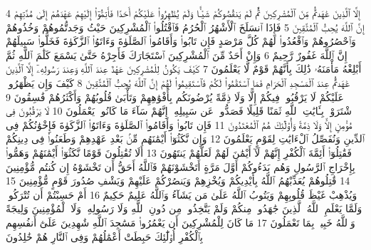 {\tiny\colorbox{cl_aya}{4}} إِلَّا ٱلَّذِينَ عَٰهَدتُّم مِّنَ ٱلْمُشْرِكِينَ ثُمَّ لَمْ يَنقُصُوكُمْ شَيْـًٔا وَلَمْ يُظَٰهِرُوا۟ عَلَيْكُمْ أَحَدًا فَأَتِمُّوٓا۟ إِلَيْهِمْ عَهْدَهُمْ إِلَىٰ مُدَّتِهِمْ إِنَّ ٱللَّهَ يُحِبُّ ٱلْمُتَّقِينَ
{\tiny\colorbox{cl_aya}{5}} فَإِذَا ٱنسَلَخَ ٱلْأَشْهُرُ ٱلْحُرُمُ فَٱقْتُلُوا۟ ٱلْمُشْرِكِينَ حَيْثُ وَجَدتُّمُوهُمْ وَخُذُوهُمْ وَٱحْصُرُوهُمْ وَٱقْعُدُوا۟ لَهُمْ كُلَّ مَرْصَدٍ فَإِن تَابُوا۟ وَأَقَامُوا۟ ٱلصَّلَوٰةَ وَءَاتَوُا۟ ٱلزَّكَوٰةَ فَخَلُّوا۟ سَبِيلَهُمْ إِنَّ ٱللَّهَ غَفُورٌ رَّحِيمٌ
{\tiny\colorbox{cl_aya}{6}} وَإِنْ أَحَدٌ مِّنَ ٱلْمُشْرِكِينَ ٱسْتَجَارَكَ فَأَجِرْهُ حَتَّىٰ يَسْمَعَ كَلَٰمَ ٱللَّهِ ثُمَّ أَبْلِغْهُ مَأْمَنَهُۥ ذَٰلِكَ بِأَنَّهُمْ قَوْمٌ لَّا يَعْلَمُونَ
{\tiny\colorbox{cl_aya}{7}} كَيْفَ يَكُونُ لِلْمُشْرِكِينَ عَهْدٌ عِندَ ٱللَّهِ وَعِندَ رَسُولِهِۦٓ إِلَّا ٱلَّذِينَ عَٰهَدتُّمْ عِندَ ٱلْمَسْجِدِ ٱلْحَرَامِ فَمَا ٱسْتَقَٰمُوا۟ لَكُمْ فَٱسْتَقِيمُوا۟ لَهُمْ إِنَّ ٱللَّهَ يُحِبُّ ٱلْمُتَّقِينَ
{\tiny\colorbox{cl_aya}{8}} كَيْفَ وَإِن يَظْهَرُوا۟ عَلَيْكُمْ لَا يَرْقُبُوا۟ فِيكُمْ إِلًّا وَلَا ذِمَّةً يُرْضُونَكُم بِأَفْوَٰهِهِمْ وَتَأْبَىٰ قُلُوبُهُمْ وَأَكْثَرُهُمْ فَٰسِقُونَ
{\tiny\colorbox{cl_aya}{9}} ٱشْتَرَوْا۟ بِـَٔايَٰتِ ٱللَّهِ ثَمَنًا قَلِيلًا فَصَدُّوا۟ عَن سَبِيلِهِۦٓ إِنَّهُمْ سَآءَ مَا كَانُوا۟ يَعْمَلُونَ
{\tiny\colorbox{cl_aya}{10}} لَا يَرْقُبُونَ فِى مُؤْمِنٍ إِلًّا وَلَا ذِمَّةً وَأُو۟لَٰٓئِكَ هُمُ ٱلْمُعْتَدُونَ
{\tiny\colorbox{cl_aya}{11}} فَإِن تَابُوا۟ وَأَقَامُوا۟ ٱلصَّلَوٰةَ وَءَاتَوُا۟ ٱلزَّكَوٰةَ فَإِخْوَٰنُكُمْ فِى ٱلدِّينِ وَنُفَصِّلُ ٱلْءَايَٰتِ لِقَوْمٍ يَعْلَمُونَ
{\tiny\colorbox{cl_aya}{12}} وَإِن نَّكَثُوٓا۟ أَيْمَٰنَهُم مِّنۢ بَعْدِ عَهْدِهِمْ وَطَعَنُوا۟ فِى دِينِكُمْ فَقَٰتِلُوٓا۟ أَئِمَّةَ ٱلْكُفْرِ إِنَّهُمْ لَآ أَيْمَٰنَ لَهُمْ لَعَلَّهُمْ يَنتَهُونَ
{\tiny\colorbox{cl_aya}{13}} أَلَا تُقَٰتِلُونَ قَوْمًا نَّكَثُوٓا۟ أَيْمَٰنَهُمْ وَهَمُّوا۟ بِإِخْرَاجِ ٱلرَّسُولِ وَهُم بَدَءُوكُمْ أَوَّلَ مَرَّةٍ أَتَخْشَوْنَهُمْ فَٱللَّهُ أَحَقُّ أَن تَخْشَوْهُ إِن كُنتُم مُّؤْمِنِينَ
{\tiny\colorbox{cl_aya}{14}} قَٰتِلُوهُمْ يُعَذِّبْهُمُ ٱللَّهُ بِأَيْدِيكُمْ وَيُخْزِهِمْ وَيَنصُرْكُمْ عَلَيْهِمْ وَيَشْفِ صُدُورَ قَوْمٍ مُّؤْمِنِينَ
{\tiny\colorbox{cl_aya}{15}} وَيُذْهِبْ غَيْظَ قُلُوبِهِمْ وَيَتُوبُ ٱللَّهُ عَلَىٰ مَن يَشَآءُ وَٱللَّهُ عَلِيمٌ حَكِيمٌ
{\tiny\colorbox{cl_aya}{16}} أَمْ حَسِبْتُمْ أَن تُتْرَكُوا۟ وَلَمَّا يَعْلَمِ ٱللَّهُ ٱلَّذِينَ جَٰهَدُوا۟ مِنكُمْ وَلَمْ يَتَّخِذُوا۟ مِن دُونِ ٱللَّهِ وَلَا رَسُولِهِۦ وَلَا ٱلْمُؤْمِنِينَ وَلِيجَةً وَٱللَّهُ خَبِيرٌۢ بِمَا تَعْمَلُونَ
{\tiny\colorbox{cl_aya}{17}} مَا كَانَ لِلْمُشْرِكِينَ أَن يَعْمُرُوا۟ مَسَٰجِدَ ٱللَّهِ شَٰهِدِينَ عَلَىٰٓ أَنفُسِهِم بِٱلْكُفْرِ أُو۟لَٰٓئِكَ حَبِطَتْ أَعْمَٰلُهُمْ وَفِى ٱلنَّارِ هُمْ خَٰلِدُونَ
